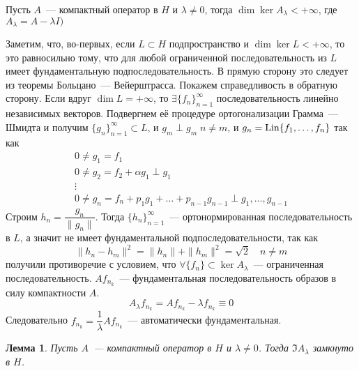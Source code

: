 \documentclass[14pt]{extarticle}
\begin{document}
\begin{Theor}
    Пусть $A$~--- компактный оператор в $H$ и $\lambda \ne 0$, тогда
    $\dim \ker A_\lambda < +\infty$, где $A_\lambda = A - \lambda I)$
\end{Theor}
\begin{Proof}
    Заметим, что, во-первых, если $L \subset H$ подпространство и $\dim \ker L
    < +\infty$, то это равносильно тому, что для любой ограниченной
    последовательность из $L$ имеет фундаментальную подпоследовательность.
    В прямую сторону это следует из теоремы Больцано~--- Вейерштрасса.
    Покажем справедливость в обратную сторону.
    Если вдруг $\dim L = +\infty$, то $\exists\{f_n\}_{n = 1}^\infty$
    последовательность линейно независимых векторов.
    Подвергнем её процедуре ортогонализации Грамма~--- Шмидта и получим $\{g_n\}
    _{n = 1}^\infty \subset L$, и $g_m \perp g_m\; n \ne m$, и $g_n = \operatorname{Lin}
    \{f_1,\dots,f_n\}$ так как
    \begin{gather*}
    0 \ne g_1 = f_1\\
    0 \ne g_2 = f_2 + \alpha g_1 \perp g_1\\
    \vdots\\
    0 \ne g_n = f_n + p_1 g_1 + \dots + p_{n - 1} g_{n - 1} \perp g_1, \dots,
    g_{n - 1}
    \end{gather*}
    Строим $h_n = \dfrac{g_n}{\|g_n\|}$.
    Тогда $\{h_n\}_{n = 1}^\infty$~--- ортонормированная последовательность в
    $L$, а значит не имеет фундаментальной подпоследовательности, так как
    $$
    \|h_n - h_m\|^2 = \|h_n\| + \|h_m\|^2 = \sqrt{2} \quad n \ne m
    $$
    получили противоречие с условием, что $\forall \{f_n\} \subset \ker A_
    \lambda$~--- ограниченная последовательность.
    $A f_{n_k}$~--- фундаментальная последовательность образов в силу
    компактности $A$.
    $$
    A_\lambda f_{n_k} = A f_{n_k} - \lambda f_{n_k} \equiv 0
    $$
    Следовательно $f_{n_k} = \dfrac{1}{\lambda}A f_{n_k}$~--- автоматически
    фундаментальная.
\end{Proof}
\newtheorem{Lemm}{Лемма}
\begin{Lemm}
    Пусть $A$~--- компактный оператор в $H$ и $\lambda \ne 0$.
    Тогда $\Im A_\lambda$ замкнуто в $H$.
\end{Lemm}
\end{document}
